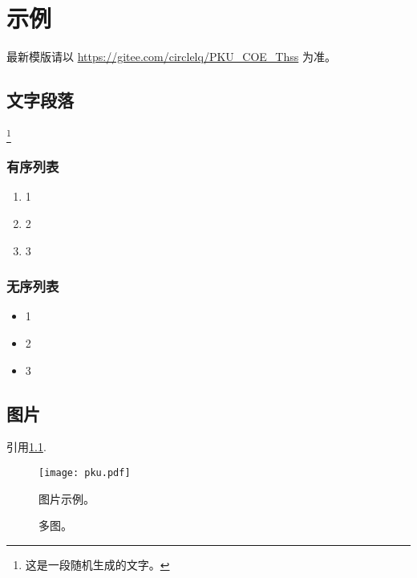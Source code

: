 \chapter{示例}

\thispagestyle{fancy}


最新模版请以 \href{https://gitee.com/circlelq/PKU\_COE\_Thss}{https://gitee.com/circlelq/PKU\_COE\_Thss} 为准。

\section{文字段落}


\lipsum[1]\footnote{这是一段随机生成的文字。}

\subsection{有序列表}

\begin{enumerate}
   \item 1
   \item 2
   \item 3
\end{enumerate}

\subsection{无序列表}

\begin{itemize}
   \item 1
   \item 2
   \item 3
\end{itemize}


\section{图片}

引用\cref{fig:1}.

\begin{figure}[htp]
   \centering
   \texttt{[image: pku.pdf]}
   \caption{图片示例。}
   \label{fig:1}
\end{figure}

\begin{figure}%
   \centering
   \quad
   \caption{多图。}
   \label{fig:2}
\end{figure}



